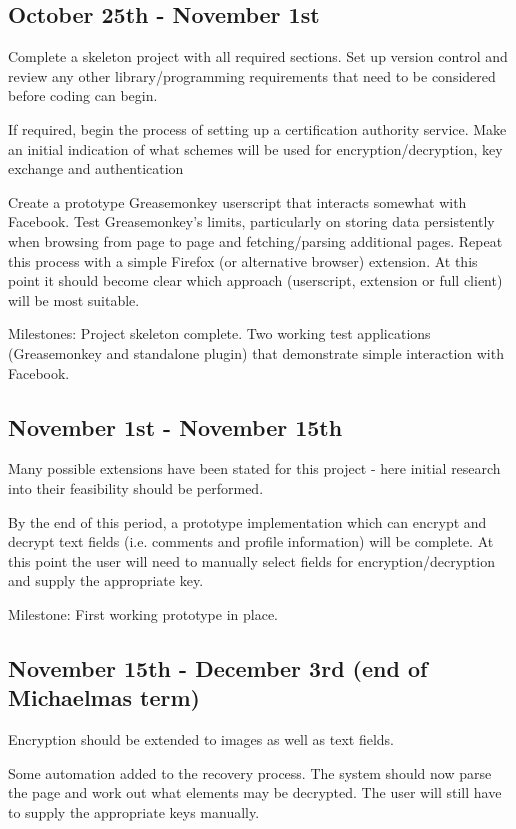 \documentclass[12pt]{article}
\begin{document}
\subsection*{October 25th - November 1st}

Complete a skeleton project with all required sections. Set up version control and review any other library/programming requirements that need to be considered before coding can begin.

If required, begin the process of setting up a certification authority service. Make an initial indication of what schemes will be used for encryption/decryption, key exchange and authentication

Create a prototype Greasemonkey userscript that interacts somewhat with Facebook. Test Greasemonkey's limits, particularly on storing data persistently when browsing from page to page and fetching/parsing additional pages. Repeat this process with a simple Firefox (or alternative browser) extension. At this point it should become clear which approach (userscript, extension or full client) will be most suitable.

Milestones: Project skeleton complete. Two working test applications (Greasemonkey and standalone plugin) that demonstrate simple interaction with Facebook.


\subsection*{November 1st - November 15th}

Many possible extensions have been stated for this project - here initial research into their feasibility should be performed.

By the end of this period, a prototype implementation which can encrypt and decrypt text fields (i.e. comments and profile information) will be complete. At this point the user will need to manually select fields for encryption/decryption and supply the appropriate key.

Milestone: First working prototype in place.

\subsection*{November 15th - December 3rd (end of Michaelmas term)}

Encryption should be extended to images as well as text fields.

Some automation added to the recovery process. The system should now parse the page and work out what elements may be decrypted. The user will still have to supply the appropriate keys manually.
\end{document}
